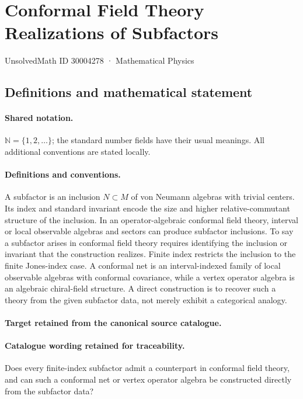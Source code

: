 \documentclass[11pt]{article}
\begin{document}
\setcounter{section}{30004277}
\section{Conformal Field Theory Realizations of Subfactors}\label{30004278}
{\small UnsolvedMath ID 30004278 · Mathematical Physics}
\subsection{Definitions and mathematical statement}

\paragraph{Shared notation.}$\mathbb N=\{1,2,\ldots\}$; the standard number fields have their usual meanings. All additional conventions are stated locally.


\paragraph{Definitions and conventions.}
A subfactor is an inclusion $N\subset M$ of von Neumann algebras with trivial centers. Its index and standard invariant encode the size and higher relative-commutant structure of the inclusion. In an operator-algebraic conformal field theory, interval or local observable algebras and sectors can produce subfactor inclusions. To say a subfactor arises in conformal field theory requires identifying the inclusion or invariant that the construction realizes. Finite index restricts the inclusion to the finite Jones-index case. A conformal net is an interval-indexed family of local observable algebras with conformal covariance, while a vertex operator algebra is an algebraic chiral-field structure. A direct construction is to recover such a theory from the given subfactor data, not merely exhibit a categorical analogy.

\paragraph{Target retained from the canonical source catalogue.}
\paragraph{Catalogue wording retained for traceability.}
Does every finite-index subfactor admit a counterpart in conformal field theory, and can such a conformal net or vertex operator algebra be constructed directly from the subfactor data?
\end{document}
